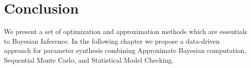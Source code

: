 \section{Conclusion}
We present a set of optimization and approximation methods which are essentials to Bayesian
Inference. In the following chapter we propose a data-driven approach for parameter synthesis
combining Approximate Bayesian computation, Sequential Monte Carlo, and Statistical Model Checking.
